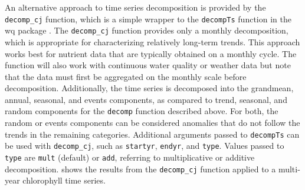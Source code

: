\documentclass[10pt,letterpaper]{article}\usepackage[]{graphicx}\usepackage[]{color}
\begin{document}
An alternative approach to time series decomposition is provided by the \texttt{decomp\_cj} function, which is a simple wrapper to the \texttt{decompTs} function in the wq package \cite{Cloern10,Jassby14}.  The \texttt{decomp\_cj} function provides only a monthly decomposition, which is appropriate for characterizing relatively long-term trends.  This approach works best for nutrient data that are typically obtained on a monthly cycle.  The function will also work with continuous water quality or weather data but note that the data must first be aggregated on the monthly scale before decomposition.  Additionally, the time series is decomposed into the grandmean, annual, seasonal, and events components, as compared to trend, seasonal, and random components for the \texttt{decomp} function described above.  For both, the random or events components can be considered anomalies that do not follow the trends in the remaining categories.  Additional arguments passed to \texttt{decompTs} can be used with \texttt{decomp\_cj}, such as \texttt{startyr}, \texttt{endyr}, and \texttt{type}.  Values passed to \texttt{type} are \texttt{mult} (default) or \texttt{add}, referring to multiplicative or additive decomposition.   shows the results from the \texttt{decomp\_cj} function applied to a multi-year chlorophyll time series.
\end{document}
